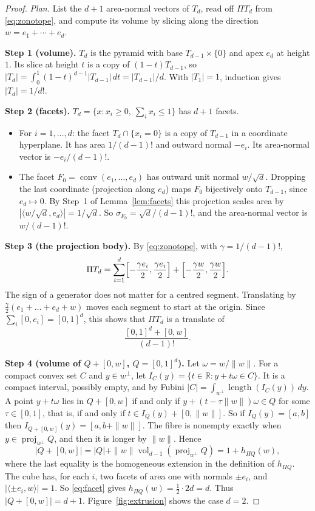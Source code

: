 \documentclass[11pt]{article}
\newcommand{\R}{\mathbb R}
\DeclareMathOperator{\conv}{conv}
\DeclareMathOperator{\vol}{vol}
\DeclareMathOperator{\proj}{proj}
\newcommand{\step}[1]{\smallskip\noindent\textbf{#1}}
\begin{document}
\begin{proof}
\emph{Plan.} List the \(d+1\) area-normal vectors of \(T_d\), read off
\(\Pi T_d\) from \eqref{eq:zonotope}, and compute its volume by slicing
along the direction \(w=e_1+\cdots+e_d\).

\step{Step 1 (volume).} \(T_d\) is the pyramid with base
\(T_{d-1}\times\{0\}\) and apex \(e_d\) at height \(1\). Its slice at
height \(t\) is a copy of \((1-t)T_{d-1}\), so
\(|T_d|=\int_0^1(1-t)^{d-1}|T_{d-1}|\,dt=|T_{d-1}|/d\). With
\(|T_1|=1\), induction gives \(|T_d|=1/d!\).

\step{Step 2 (facets).} \(T_d=\{x:x_i\ge0,\ \sum_ix_i\le1\}\) has \(d+1\)
facets.
\begin{itemize}[leftmargin=2em,itemsep=1pt,topsep=2pt]
\item For \(i=1,\dots,d\): the facet \(T_d\cap\{x_i=0\}\) is a copy of
\(T_{d-1}\) in a coordinate hyperplane. It has area \(1/(d-1)!\) and
outward normal \(-e_i\). Its area-normal vector is \(-e_i/(d-1)!\).
\item The facet \(F_0=\conv(e_1,\dots,e_d)\) has outward unit normal
\(w/\sqrt d\). Dropping the last coordinate (projection along \(e_d\))
maps \(F_0\) bijectively onto \(T_{d-1}\), since \(e_d\mapsto0\). By
Step~1 of Lemma~\ref{lem:facets} this projection scales area by
\(|\langle w/\sqrt d,e_d\rangle|=1/\sqrt d\). So
\(\sigma_{F_0}=\sqrt d/(d-1)!\), and the area-normal vector is
\(w/(d-1)!\).
\end{itemize}

\step{Step 3 (the projection body).} By \eqref{eq:zonotope}, with
\(\gamma=1/(d-1)!\),
\[
 \Pi T_d=\sum_{i=1}^d\Bigl[-\frac{\gamma e_i}2,\frac{\gamma e_i}2\Bigr]
 +\Bigl[-\frac{\gamma w}2,\frac{\gamma w}2\Bigr].
\]
The sign of a generator does not matter for a centred segment.
Translating by \(\tfrac\gamma2(e_1+\dots+e_d+w)\) moves each segment to
start at the origin. Since \(\sum_i[0,e_i]=[0,1]^d\), this shows that
\(\Pi T_d\) is a translate of
\[
 \frac{[0,1]^d+[0,w]}{(d-1)!}.
\]

\step{Step 4 (volume of \(Q+[0,w]\), \(Q=[0,1]^d\)).} Let
\(\omega=w/\|w\|\). For a compact convex set \(C\) and \(y\in w^\perp\),
let \(I_C(y)=\{t\in\R:y+t\omega\in C\}\). It is a compact interval,
possibly empty, and by Fubini
\(|C|=\int_{w^\perp}\operatorname{length}(I_C(y))\,dy\). A point
\(y+t\omega\) lies in \(Q+[0,w]\) if and only if
\(y+(t-\tau\|w\|)\omega\in Q\) for some \(\tau\in[0,1]\), that is, if and
only if \(t\in I_Q(y)+[0,\|w\|]\). So if \(I_Q(y)=[a,b]\) then
\(I_{Q+[0,w]}(y)=[a,b+\|w\|]\). The fibre is nonempty exactly when
\(y\in\proj_{w^\perp}Q\), and then it is longer by \(\|w\|\). Hence
\[
 |Q+[0,w]|
 =|Q|+\|w\|\vol_{d-1}(\proj_{w^\perp}Q)
 =1+h_{\Pi Q}(w),
\]
where the last equality is the homogeneous extension in the definition of
\(h_{\Pi Q}\). The cube has, for each \(i\), two facets of area one with
normals \(\pm e_i\), and \(|\langle\pm e_i,w\rangle|=1\). So
\eqref{eq:facet} gives \(h_{\Pi Q}(w)=\tfrac12\cdot2d=d\). Thus
\(|Q+[0,w]|=d+1\). Figure~\ref{fig:extrusion} shows the case \(d=2\).


\end{proof}
\end{document}
